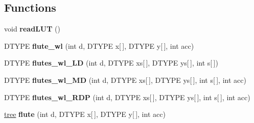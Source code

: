 \subsection*{Functions}
\begin{DoxyCompactItemize}
\item 
\hypertarget{namespaceophidian_1_1interconnection_a96bfad349c0c80e8068844f75c3ef532}{void {\bfseries read\-L\-U\-T} ()}\label{namespaceophidian_1_1interconnection_a96bfad349c0c80e8068844f75c3ef532}

\item 
\hypertarget{namespaceophidian_1_1interconnection_aba13351cd926f941a924a94b77e6f97c}{D\-T\-Y\-P\-E {\bfseries flute\-\_\-wl} (int d, D\-T\-Y\-P\-E x\mbox{[}$\,$\mbox{]}, D\-T\-Y\-P\-E y\mbox{[}$\,$\mbox{]}, int acc)}\label{namespaceophidian_1_1interconnection_aba13351cd926f941a924a94b77e6f97c}

\item 
\hypertarget{namespaceophidian_1_1interconnection_ab28987fa6694e12ffbd8901e2c09b6b8}{D\-T\-Y\-P\-E {\bfseries flutes\-\_\-wl\-\_\-\-L\-D} (int d, D\-T\-Y\-P\-E xs\mbox{[}$\,$\mbox{]}, D\-T\-Y\-P\-E ys\mbox{[}$\,$\mbox{]}, int s\mbox{[}$\,$\mbox{]})}\label{namespaceophidian_1_1interconnection_ab28987fa6694e12ffbd8901e2c09b6b8}

\item 
\hypertarget{namespaceophidian_1_1interconnection_a092a9985036fdaa3d92b02e6a71fbca6}{D\-T\-Y\-P\-E {\bfseries flutes\-\_\-wl\-\_\-\-M\-D} (int d, D\-T\-Y\-P\-E xs\mbox{[}$\,$\mbox{]}, D\-T\-Y\-P\-E ys\mbox{[}$\,$\mbox{]}, int s\mbox{[}$\,$\mbox{]}, int acc)}\label{namespaceophidian_1_1interconnection_a092a9985036fdaa3d92b02e6a71fbca6}

\item 
\hypertarget{namespaceophidian_1_1interconnection_a9c77af8396a08498643e611a10b441dc}{D\-T\-Y\-P\-E {\bfseries flutes\-\_\-wl\-\_\-\-R\-D\-P} (int d, D\-T\-Y\-P\-E xs\mbox{[}$\,$\mbox{]}, D\-T\-Y\-P\-E ys\mbox{[}$\,$\mbox{]}, int s\mbox{[}$\,$\mbox{]}, int acc)}\label{namespaceophidian_1_1interconnection_a9c77af8396a08498643e611a10b441dc}

\item 
\hypertarget{namespaceophidian_1_1interconnection_a700b5dc370c0ba5bb452a57a3d159c6c}{\hyperlink{structophidian_1_1interconnection_1_1tree}{tree} {\bfseries flute} (int d, D\-T\-Y\-P\-E x\mbox{[}$\,$\mbox{]}, D\-T\-Y\-P\-E y\mbox{[}$\,$\mbox{]}, int acc)}\label{namespaceophidian_1_1interconnection_a700b5dc370c0ba5bb452a57a3d159c6c}


\end{DoxyCompactItemize}
